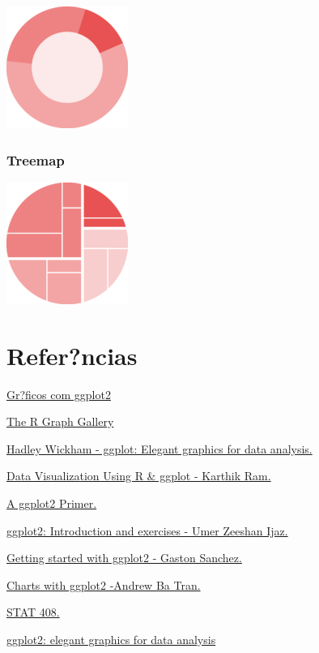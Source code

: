 \documentclass[]{article}
\begin{document}
\includegraphics{img/donut.png}

\hypertarget{treemap}{%
\subsubsection{Treemap}\label{treemap}}

\includegraphics{img/treemap.png}

\hypertarget{referncias}{%
\section{Refer?ncias}\label{referncias}}

\href{https://www.curso-r.com/material/ggplot/}{Gr?ficos com ggplot2}

\href{https://www.r-graph-gallery.com/index.html}{The R Graph Gallery}

\href{http://moderngraphics11.pbworks.com/f/ggplot2-Book09hWickham.pdf}{Hadley
Wickham - ggplot: Elegant graphics for data analysis.}

\href{https://combine-australia.github.io/r-novice-gapminder/ggplot.pdf}{Data
Visualization Using R \& ggplot - Karthik Ram.}

\href{https://www.data-action-lab.com/wp-content/uploads/2018/11/DSRS_GGP2.pdf}{A
ggplot2 Primer.}

\href{http://userweb.eng.gla.ac.uk/umer.ijaz/bioinformatics/ecological/ggplot2.pdf}{ggplot2:
Introduction and exercises - Umer Zeeshan Ijaz.}

\href{https://github.com/ucb-stat133/stat133-fall-2016/blob/master/notes/09-ggplot2/09-ggplot2.pdf}{Getting
started with ggplot2 - Gaston Sanchez.}

\href{https://journalismcourses.org/courses/RC0818/charts_with_ggplot.pdf}{Charts
with ggplot2 -Andrew Ba Tran.}

\href{http://www.math.montana.edu/ahoegh/teaching/stat408/lecturematerials/}{STAT
408.}

\href{https://github.com/hadley/ggplot2-book}{ggplot2: elegant graphics
for data analysis}
\end{document}
